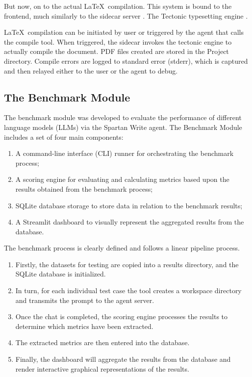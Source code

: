 But now, on to the actual \LaTeX\ compilation.
This system is bound to the frontend, much similarly to the sidecar server \cite{tauri_sidecar}.
The Tectonic typesetting engine \cite{tectonic}.

\LaTeX\ compilation can be initiated by user or triggered by the agent that calls the compile tool.
When triggered, the sidecar invokes the tectonic engine to actually compile the document.
PDF files created are stored in the Project directory.
Compile errors are logged to standard error (stderr), which is captured and then relayed either to the user or the agent to debug.

\subsection{The Benchmark Module}

The benchmark module was developed to evaluate the performance of different language models (LLMs) via the Spartan Write agent.
The Benchmark Module includes a set of four main components:

\begin{enumerate}
\item A command-line interface (CLI) runner for orchestrating the benchmark process; 
\item A scoring engine for evaluating and calculating metrics based upon the results obtained from the benchmark process; 
\item SQLite database storage to store data in relation to the benchmark results; 
\item A Streamlit dashboard to visually represent the aggregated results from the database. 
\end{enumerate}

The benchmark process is clearly defined and follows a linear pipeline process. 

\begin{enumerate}
\item Firstly, the datasets for testing are copied into a results directory, and the SQLite database is initialized. 
\item In turn, for each individual test case the tool creates a workspace directory and transmits the prompt to the agent server. 
\item Once the chat is completed, the scoring engine processes the results to determine which metrics have been extracted. 
\item The extracted metrics are then entered into the database. 
\item Finally, the dashboard will aggregate the results from the database and render interactive graphical representations of the results. 
\end{enumerate}

